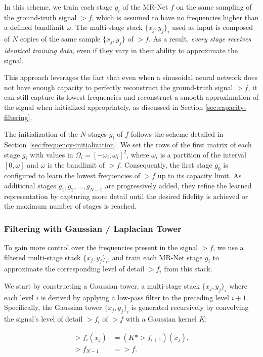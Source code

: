 In this scheme, we train each stage $g_i$ of the MR-Net $f$ on the same sampling of the ground-truth signal $\gt{f}$, which is assumed to have no frequencies higher than a defined bandlimit $\omega$. The multi-stage stack $\{x_j, y_j\}_i$ used as input is composed of $N$ copies of the same sample $\{x_j, y_j\}$ of $\gt{f}$. As a result, \textit{every stage receives identical training data}, even if they vary in their ability to approximate the signal.

This approach leverages the fact that even when a sinusoidal neural network does not have enough capacity to perfectly reconstruct the ground-truth signal $\gt{f}$, it can still capture its lowest frequencies and reconstruct a smooth approximation of the signal when initialized appropriately, as discussed in Section \ref{sec:capacity-filtering}. 

The initialization of the $N$ stages $g_i$ of $f$ follows the scheme detailed in Section~\ref{sec:frequency-initialization}. We set the rows of the first matrix of each stage $g_i$ with values in $\Omega_i=[-\omega_i, \omega_i]^2$, where $\omega_i$ is a partition of the interval $[0,\omega]$ and $\omega$ is the bandlimit of $\gt{f}$. Consequently, the first stage $g_0$ is configured to learn the lowest frequencies of $\gt{f}$ up to its capacity limit. As additional stages $g_1, g_2, \ldots, g_{N-1}$ are progressively added, they refine the learned representation by capturing more detail until the desired fidelity is achieved or the maximum number of stages is reached.

\subsubsection{Filtering with Gaussian / Laplacian Tower}

To gain more control over the frequencies present in the signal $\gt{f}$, we use a filtered multi-stage stack $\{x_j, y_j\}_i$, and train each MR-Net stage $g_i$ to approximate the corresponding level of detail \( \gt{f}_i \) from this stack.

We start by constructing a Gaussian tower, a multi-stage stack $\{x_j, y_j\}_i$ where each level $i$ is derived by applying a low-pass filter to the preceding level $i+1$. Specifically, the Gaussian tower $\{x_j, y_j\}_i$ is generated recursively by convolving the signal's level of detail $\gt{f}_i$ of $\gt{f}$ with a Gaussian kernel $K$:

\begin{align*}
    \gt{f}_i(x_j) &= \left(K * \gt{f}_{i+1}\right)(x_j), \\
    \gt{f}_{N-1} &= \gt{f}.
\end{align*}


